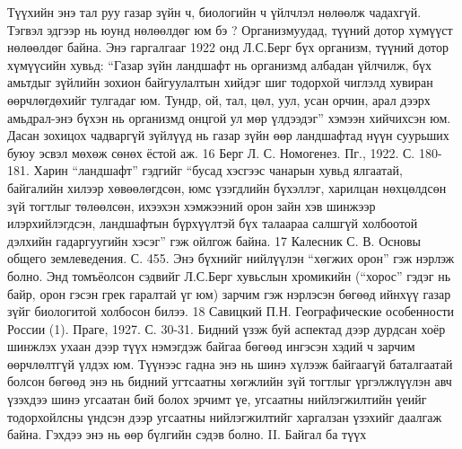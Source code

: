 Түүхийн энэ тал руу газар зүйн ч, биологийн ч үйлчлэл нөлөөлж чадахгүй. Тэгвэл эдгээр нь юунд нөлөөлдөг юм бэ ? Организмуудад, түүний дотор хүмүүст нөлөөлдөг байна. Энэ гаргалгааг 1922 онд Л.С.Берг бүх организм, түүний дотор хүмүүсийн хувьд: “Газар зүйн ландшафт нь организмд албадан үйлчилж, бүх амьтдыг зүйлийн зохион байгуулалтын хийдэг шиг тодорхой чиглэлд хувиран өөрчлөгдөхийг тулгадаг юм. Тундр, ой, тал, цөл, уул, усан орчин, арал дээрх амьдрал-энэ бүхэн нь организмд онцгой ул мөр үлдээдэг” хэмээн хийчихсэн юм.
Дасан зохицох чадваргүй зүйлүүд нь газар зүйн өөр ландшафтад нүүн суурьших буюу эсвэл мөхөж сөнөх ёстой аж.
16 Берг Л. С. Номогенез. Пг., 1922. С. 180-181.
Харин “ландшафт” гэдгийг “бусад хэсгээс чанарын хувьд ялгаатай, байгалийн хилээр хөвөөлөгдсөн, юмс үзэгдлийн бүхэллэг, харилцан нөхцөлдсөн зүй тогтлыг төлөөлсөн, ихээхэн хэмжээний орон зайн хэв шинжээр илэрхийлэгдсэн, ландшафтын бүрхүүлтэй бүх талаараа салшгүй холбоотой дэлхийн гадаргуугийн хэсэг” гэж ойлгож байна.
17 Калесник С. В. Основы общего землеведения. С. 455.
Энэ бүхнийг нийлүүлэн “хөгжих орон” гэж нэрлэж болно. Энд томъёолсон сэдвийг Л.С.Берг хувьслын хромикийн (“хорос” гэдэг нь байр, орон гэсэн грек гаралтай үг юм) зарчим гэж нэрлэсэн бөгөөд ийнхүү газар зүйг биологитой холбосон билээ.
18 Савицкий П.Н. Географические особенности России (1). Праге, 1927. С. 30-31.
Бидний үзэж буй аспектад дээр дурдсан хоёр шинжлэх ухаан дээр түүх нэмэгдэж байгаа бөгөөд ингэсэн хэдий ч зарчим өөрчлөлтгүй үлдэх юм. Түүнээс гадна энэ нь шинэ хүлээж байгаагүй баталгаатай болсон бөгөөд энэ нь бидний угтсаатны хөгжлийн зүй тогтлыг үргэлжлүүлэн авч үзэхдээ шинэ угсаатан бий болох эрчимт үе, угсаатны нийлэгжилтийн үеийг тодорхойлсны үндсэн дээр угсаатны нийлэгжилтийг харгалзан үзэхийг даалгаж байна. Гэхдээ энэ нь өөр бүлгийн сэдэв болно.
II. Байгал ба түүх

